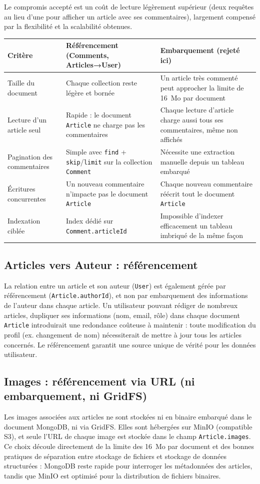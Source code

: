 \documentclass[11pt,a4paper]{article}
\begin{document}
Le compromis accepté est un coût de lecture légèrement supérieur (deux requêtes au lieu d'une pour afficher un article avec ses commentaires), largement compensé par la flexibilité et la scalabilité obtenues.

\begin{longtable}{p{2.6cm}p{5cm}p{5cm}}
\toprule
\textbf{Critère} & \textbf{Référencement (Comments, Articles→User)} & \textbf{Embarquement (rejeté ici)} \\
\midrule
\endhead
Taille du document & Chaque collection reste légère et bornée & Un article très commenté peut approcher la limite de 16~Mo par document \\
Lecture d'un article seul & Rapide : le document \texttt{Article} ne charge pas les commentaires & Chaque lecture d'article charge aussi tous ses commentaires, même non affichés \\
Pagination des commentaires & Simple avec \texttt{find} + \texttt{skip}/\texttt{limit} sur la collection \texttt{Comment} & Nécessite une extraction manuelle depuis un tableau embarqué \\
Écritures concurrentes & Un nouveau commentaire n'impacte pas le document \texttt{Article} & Chaque nouveau commentaire réécrit tout le document \texttt{Article} \\
Indexation ciblée & Index dédié sur \texttt{Comment.articleId} & Impossible d'indexer efficacement un tableau imbriqué de la même façon \\
\bottomrule
\end{longtable}

\subsection{Articles vers Auteur : référencement}
La relation entre un article et son auteur (\texttt{User}) est également gérée par référencement (\texttt{Article.authorId}), et non par embarquement des informations de l'auteur dans chaque article. Un utilisateur pouvant rédiger de nombreux articles, dupliquer ses informations (nom, email, rôle) dans chaque document \texttt{Article} introduirait une redondance coûteuse à maintenir : toute modification du profil (ex. changement de nom) nécessiterait de mettre à jour tous les articles concernés. Le référencement garantit une source unique de vérité pour les données utilisateur.

\subsection{Images : référencement via URL (ni embarquement, ni GridFS)}
Les images associées aux articles ne sont stockées ni en binaire embarqué dans le document MongoDB, ni via GridFS. Elles sont hébergées sur MinIO (compatible S3), et seule l'URL de chaque image est stockée dans le champ \texttt{Article.images}. Ce choix découle directement de la limite des 16~Mo par document et des bonnes pratiques de séparation entre stockage de fichiers et stockage de données structurées : MongoDB reste rapide pour interroger les métadonnées des articles, tandis que MinIO est optimisé pour la distribution de fichiers binaires.
\end{document}
